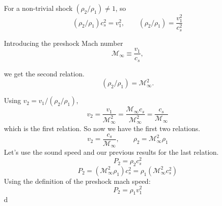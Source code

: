 For a non-trivial shock \((\rho_2/\rho_1) \neq 1\), so
\begin{equation}
    (\rho_2/\rho_1) c_s^2 = v_1^2,
\qquad
(\rho_2/\rho_1) = \frac{v_1^2}{c_s^2}
\end{equation}

Introducing the preshock Mach number
\begin{equation}
    \mathcal M_\infty \equiv \frac{v_1}{c_s},
\end{equation}

we get the second relation.
\begin{equation}
    (\rho_2/\rho_1) = \mathcal M_\infty^2.
\end{equation}

Using \(v_2 = v_1/(\rho_2/\rho_1)\),
\begin{equation}
    v_2 = \frac{v_1}{\mathcal M_\infty^2}
= \frac{\mathcal M_\infty c_s}{\mathcal M_\infty^2}
= \frac{c_s}{\mathcal M_\infty}
\end{equation}
which is the first relation. So now we have the first two relations.
\[
\boxed{v_2 = \frac{c_s}{\mathcal M_\infty}}, \qquad
\boxed{\rho_2 = \mathcal M_\infty^2 \rho_1}
\]
Let's use the sound speed and our previous results for the last relation.
\begin{equation}
    P_2 = \rho_2 c_s^2
\end{equation}
\begin{equation}
    P_2 = (\mathcal{M}_\infty^2 \rho_1)c_s^2 = \rho_1 (\mathcal{M}_\infty^2 c_s^2)
\end{equation}
Using the definition of the preshock mach speed:
\begin{equation*}
    \boxed{P_2 = \rho_1 v_1^2}
\end{equation*}
d